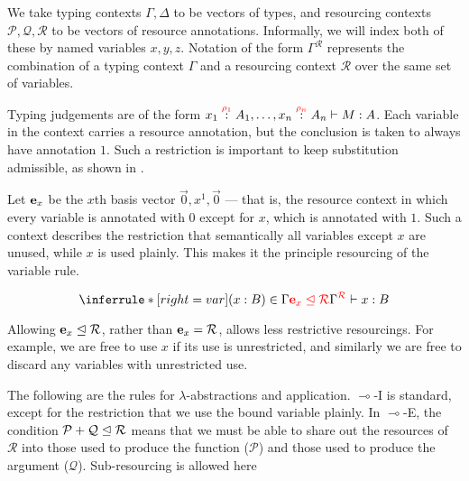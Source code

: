 We take typing contexts $\Gamma, \Delta$ to be vectors of types, and resourcing
contexts $\mathcal P, \mathcal Q, \mathcal R$ to be vectors of resource
annotations.
Informally, we will index both of these by named variables $x, y, z$.
Notation of the form $\Gamma^{\mathcal R}$ represents the combination of a
typing context $\Gamma$ and a resourcing context $\mathcal R$ over the same set
of variables.

Typing judgements are of the form
$\ctxvar{x_1}{A_1}{\rho_1}, \ldots, \ctxvar{x_n}{A_n}{\rho_n} \vdash M : A$.
Each variable in the context carries a resource annotation, but the conclusion
is taken to always have annotation $1$.
Such a restriction is important to keep substitution admissible, as shown in
\cite{quantitative-type-theory}.

Let $\basis x$ be the $x$th basis vector $\vec 0, x^1, \vec 0$ --- that is, the
resource context in which every variable is annotated with $0$ except for $x$,
which is annotated with $1$.
Such a context describes the restriction that semantically all variables except
$x$ are unused, while $x$ is used plainly.
This makes it the principle resourcing of the variable rule.

\[
\inferrule*[right=var]
{(x : B) \in \Gamma
  \\ \subrctx{\basis x}{\mathcal R}
}
{\ctx{\Gamma}{\mathcal R} \vdash x : B}
\]

Allowing $\basis x \subres \mathcal R$, rather than $\basis x = \mathcal R$,
allows less restrictive resourcings.
For example, we are free to use $x$ if its use is unrestricted, and similarly we
are free to discard any variables with unrestricted use.

The following are the rules for $\lambda$-abstractions and application.
$\multimap$-I is standard, except for the restriction that we use the bound
variable plainly.
In $\multimap$-E, the condition $\mathcal P + \mathcal Q \subres \mathcal R$
means that we must be able to share out the resources of $\mathcal R$ into
those used to produce the function ($\mathcal P$) and those used to produce the
argument ($\mathcal Q$).
Sub-resourcing is allowed here 


